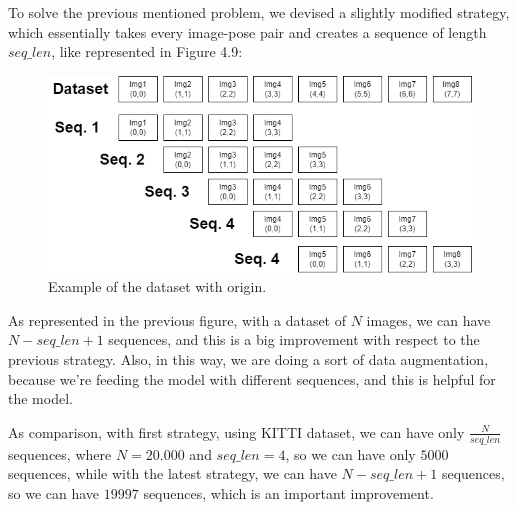 To solve the previous mentioned problem, we devised a slightly modified strategy, which essentially takes every image-pose pair and creates a sequence of length $seq\_len$, like represented in Figure 4.9:
\begin{figure}[H]
    \centering
    \includegraphics[width=\textwidth]{images/4_2_split_traj_2}
    \caption{Example of the dataset with origin.}
    \label{fig:example-of-dataset-with-origin-2}
\end{figure}
As represented in the previous figure, with a dataset of $N$ images, we can have $N - seq\_len +1 $ sequences, and this is a big improvement with respect to the previous strategy.
Also, in this way, we are doing a sort of data augmentation, because we're feeding the model with different sequences, and this is helpful for the model.

As comparison, with first strategy, using KITTI dataset, we can have only $\frac{N}{seq\_len}$ sequences, where $N = 20.000$ and $seq\_len = 4$, so we can have only $5000$ sequences, while with the latest strategy, we can have $N - seq\_len +1$ sequences, so we can have $19997$ sequences, which is an important improvement.
